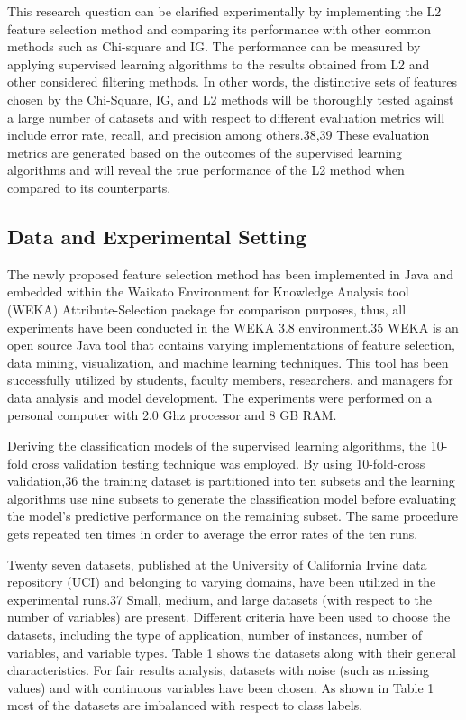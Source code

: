 \documentclass[review]{elsarticle}
\begin{document}
This research question can be clarified experimentally by implementing the L2 feature selection method and comparing its performance with other common methods such as Chi-square and IG. The performance can be measured by applying supervised learning algorithms to the results obtained from L2 and other considered filtering methods. In other words, the distinctive sets of features chosen by the Chi-Square, IG, and L2 methods will be thoroughly tested against a large number of datasets and with respect to different evaluation metrics will include error rate, recall, and precision among others.38,39 These evaluation metrics are generated based on the outcomes of the supervised learning algorithms and will reveal the true performance of the L2 method when compared to its counterparts.

\subsection{Data and Experimental Setting }

The newly proposed feature selection method has been implemented in Java and embedded within the Waikato Environment for Knowledge Analysis tool (WEKA) Attribute-Selection package for comparison purposes, thus, all experiments have been conducted in the WEKA 3.8 environment.35  WEKA is an open source Java tool that contains varying implementations of feature selection, data mining, visualization, and machine learning techniques. This tool has been successfully utilized by students, faculty members, researchers, and managers for data analysis and model development. The experiments were performed on a personal computer with 2.0 Ghz processor and 8 GB RAM. 

Deriving the classification models of the supervised learning algorithms, the 10-fold cross validation testing technique was employed. By using 10-fold-cross validation,36  the training dataset is partitioned into ten subsets and the learning algorithms use nine subsets to generate the classification model before evaluating the model’s predictive performance on the remaining subset. The same procedure gets repeated ten times in order to average the error rates of the ten runs.

Twenty seven datasets, published at the University of California Irvine data repository (UCI) and belonging to varying domains, have been utilized in the experimental runs.37  Small, medium, and large datasets (with respect to the number of variables) are present. Different criteria have been used to choose the datasets, including the type of application, number of instances, number of variables, and variable types. Table 1 shows the datasets along with their general characteristics.  For fair results analysis, datasets with noise (such as missing values) and with continuous variables have been chosen. As shown in Table 1 most of the datasets are imbalanced with respect to class labels.
\end{document}
